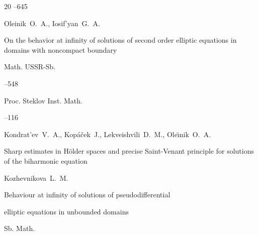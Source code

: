 \begin{thebibliography}{20}
--645










\by Oleinik~O.~A., Iosif'yan~G.~A.

\paper On the behavior at infinity of solutions of second order elliptic equations in domains with noncompact boundary

\jour Math. USSR-Sb.




--548










\jour Proc. Steklov Inst. Math.



--116

\by Kondrat'ev~V.~A., Kop\'a\v{c}ek~J., Lekveishvili~D.~M., Ole\u{\i}nik~O.~A.

\paper Sharp estimates in H\"older spaces and precise Saint-Venant principle for solutions of the biharmonic equation




\by Kozhevnikova~L.~M.

\paper Behaviour at infinity of solutions of pseudodifferential

elliptic equations in unbounded domains

\jour Sb. Math.





\end{thebibliography}
